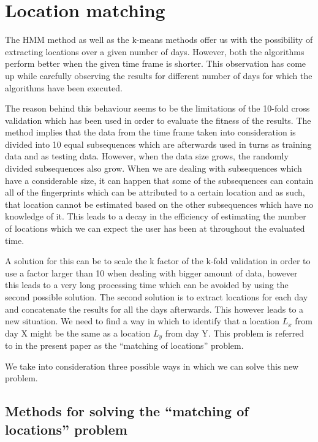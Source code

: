 \chapter{Location matching}
\label{ch_matching}

The HMM method as well as the k-means methods offer us with the possibility of
extracting locations over a given number of days. However, both the algorithms
perform better when the given time frame is shorter. This observation has come
up while carefully observing the results for different number of days for which
the algorithms have been executed. 

The reason behind this behaviour seems to be the limitations of the 10-fold
cross validation which has been used in order to evaluate the fitness of the
results. The method implies that the data from the time frame taken into
consideration is divided into 10 equal subsequences which are afterwards used in
turns as training data and as testing data. However, when the data size grows,
the randomly divided subsequences also grow. When we are dealing with
subsequences which have a considerable size, it can happen that some of the
subsequences can contain all of the fingerprints which can be attributed to a
certain location and as such, that location cannot be estimated based on the
other subsequences which have no knowledge of it. This leads to a decay in the
efficiency of estimating the number of locations which we can expect the user
has been at throughout the evaluated time.

A solution for this can be to scale the k factor of the k-fold validation in
order to use a factor larger than 10 when dealing with bigger amount of data,
however this leads to a very long processing time which can be avoided by using
the second possible solution. The second solution is to extract locations for
each day and concatenate the results for all the days afterwards. This however
leads to a new situation. We need to find a way in which to identify that a
location $L_{x}$ from day X might be the same as a location $L_{y}$ from day Y.
This problem is referred to in the present paper as the ``matching of
locations'' problem.

We take into consideration three possible ways in which we can solve this new
problem.

\section{Methods for solving the ``matching of locations'' problem}

